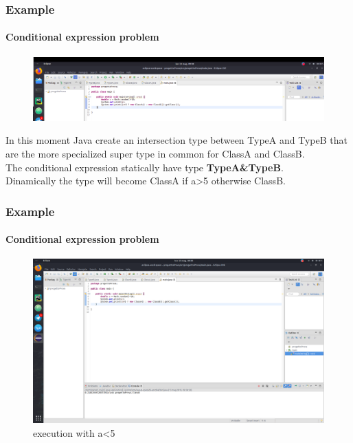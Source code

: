 \documentclass{beamer}
\begin{document}
\begin{frame}
\frametitle{Example}
\framesubtitle{Conditional expression problem}
\begin{figure}
\centering
\includegraphics[width=1\linewidth]{"images/Schermata da 2019-05-13 11-59-49"}
\label{fig:schermata-da-2019-05-13-11-59-49}
\end{figure}
In this moment Java create an intersection type between TypeA and TypeB that are the more specialized super type in common for ClassA and ClassB.\\
The conditional expression statically have type \textbf{TypeA\&TypeB}.\\
Dinamically the type will become ClassA if a>5 otherwise ClassB.
\end{frame}

\begin{frame}
\frametitle{Example}
\framesubtitle{Conditional expression problem}
\begin{figure}
\centering
\includegraphics[width=1\linewidth]{images/mainres}
\caption{ execution with a<5}
\label{fig:mainres}
\end{figure}
\end{frame}
\end{document}
